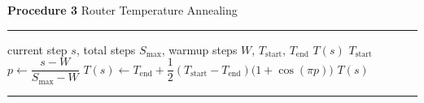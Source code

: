 \documentclass[varwidth=190mm,border=8pt]{standalone}
\begin{document}
\begin{minipage}{180mm}
\small
\noindent\textbf{Procedure 3} Router Temperature Annealing\par
\vspace{2pt}\hrule\vspace{4pt}
\begin{algorithmic}[1]
\Require current step $s$, total steps $S_{\max}$, warmup steps $W$, $T_{\mathrm{start}}$, $T_{\mathrm{end}}$
\Ensure $T(s)$
  \State \Return $T_{\mathrm{start}}$
\Else
  \State $p \gets \dfrac{s - W}{S_{\max} - W}$
  \State $T(s) \gets T_{\mathrm{end}} + \dfrac{1}{2}(T_{\mathrm{start}} - T_{\mathrm{end}})\bigl(1 + \cos(\pi p)\bigr)$
  \State \Return $T(s)$
\EndIf
\end{algorithmic}
\vspace{4pt}\hrule
\end{minipage}
\end{document}

